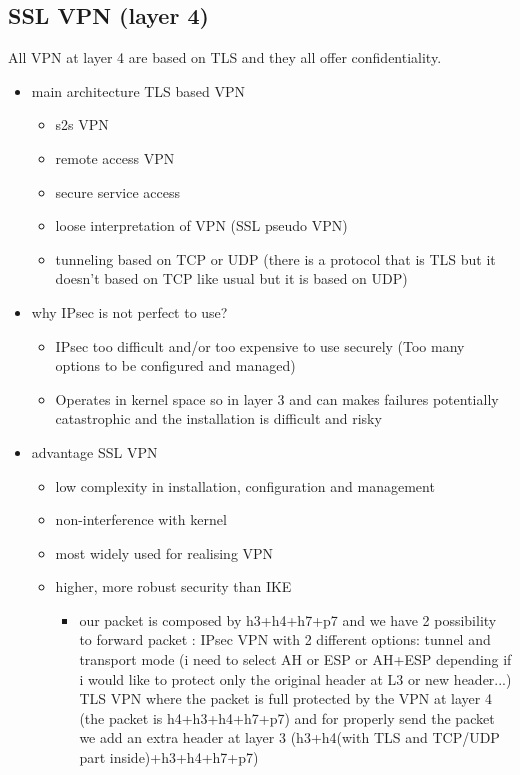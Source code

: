 \documentclass{article}
\begin{document}
\subsection{SSL VPN (layer 4)}
All VPN at layer 4 are based on TLS and they all offer confidentiality.
\begin{itemize}
    \item main architecture TLS based VPN
    \begin{itemize}
        \item s2s VPN
        \item remote access VPN
        \item secure service access
        \item loose interpretation of VPN (SSL pseudo VPN)
        \item tunneling based on TCP or UDP (there is a protocol that is TLS but it doesn't based on TCP like usual but it is based on UDP)
    \end{itemize}
    \item why IPsec is not perfect to use?
    \begin{itemize}
        \item IPsec too difficult and/or too expensive to use securely (Too many options to be configured and managed)
        \item Operates in kernel space so in layer 3 and can makes failures potentially catastrophic and the installation is difficult and risky 
    \end{itemize}
    \item advantage SSL VPN
    \begin{itemize}
        \item low complexity in installation, configuration and management
        \item non-interference with kernel
        \item most widely used for realising VPN
        \item higher, more robust security than IKE
        \begin{itemize}
            \item our packet is composed by h3+h4+h7+p7 and we have 2 possibility to forward packet : 
            IPsec VPN with 2 different options: tunnel and transport mode (i need to select AH or ESP or AH+ESP depending if i would like to protect only the original header at L3 or new header...)
            TLS VPN where the packet is full protected by the VPN at layer 4 (the packet is h4+h3+h4+h7+p7) and for properly send the packet we add an extra header at layer 3 (h3+h4(with TLS and TCP/UDP part inside)+h3+h4+h7+p7)

\end{itemize}
\end{itemize}
\end{itemize}
\end{document}
